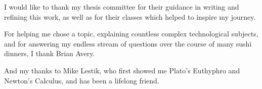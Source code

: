 \noindent I would like to thank my thesis committee for their guidance in writing and refining this work, as well as for their classes which helped to inspire my journey.

\vspace{1cm}

\noindent For helping me chose a topic, explaining countless complex technological subjects, and for answering my endless stream of questions over the course of many sushi dinners, I thank Brian Avery.

\vspace{1cm}

\noindent And my thanks to Mike Lestik, who first showed me Plato's Euthyphro and Newton's Calculus, and has been a lifelong friend.
